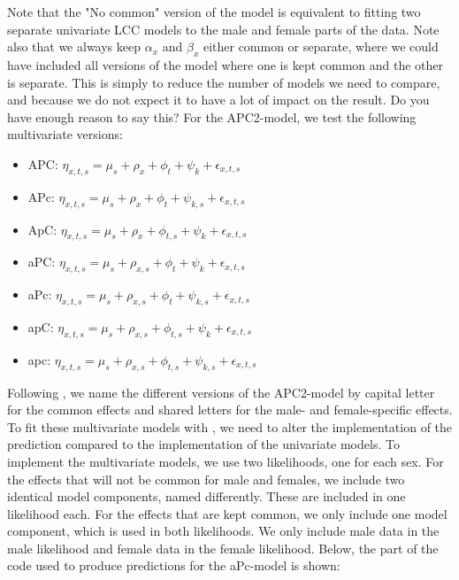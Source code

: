 Note that the "No common" version of the model is equivalent to fitting two separate univariate LCC models to the male and female parts of the data. Note also that we always keep $\alpha_x$ and $\beta_x$ either common or separate, where we could have included all versions of the model where one is kept common and the other is separate. This is simply to reduce the number of models we need to compare, and because we do not expect it to have a lot of impact on the result. \textcolor{myDarkGreen}{Do you have enough reason to say this? }
For the APC2-model, we test the following multivariate versions:
\begin{itemize}
    \item APC: $\eta_{x,t,s}= \mu_{s} + \rho_x + \phi_t + \psi_k + \epsilon_{x,t,s}$ 
    \item APc: $\eta_{x,t,s}= \mu_{s} + \rho_x + \phi_t + \psi_{k,s} + \epsilon_{x,t,s}$ 
    \item ApC: $\eta_{x,t,s}= \mu_{s} + \rho_x + \phi_{t,s} + \psi_{k} + \epsilon_{x,t,s}$ 
    \item aPC: $\eta_{x,t,s}= \mu_{s} + \rho_{x,s} + \phi_{t} + \psi_{k} + \epsilon_{x,t,s}$ 
    \item aPc: $\eta_{x,t,s}= \mu_{s} + \rho_{x,s} + \phi_{t} + \psi_{k,s} + \epsilon_{x,t,s}$ 
    \item apC: $\eta_{x,t,s}= \mu_{s} + \rho_{x,s} + \phi_{t, s} + \psi_{k} + \epsilon_{x,t,s}$ 
    \item apc: $\eta_{x,t,s}= \mu_{s} + \rho_{x,s} + \phi_{t, s} + \psi_{k, s} + \epsilon_{x,t,s}$
\end{itemize}
Following \textcite{rieblerHeld2010}, we name the different versions of the APC2-model by capital letter for the common effects and shared letters for the male- and female-specific effects.  
\newpar To fit these multivariate models with \inlarbu, we need to alter the implementation of the prediction compared to the implementation of the univariate models. To implement the multivariate models, we use two likelihoods, one for each sex. For the effects that will not be common for male and females, we include two identical model components, named differently. These are included in one likelihood each. For the effects that are kept common, we only include one model component, which is used in both likelihoods. We only include male data in the male likelihood and female data in the female likelihood. Below, the part of the code used to produce predictions for the aPc-model is shown:

